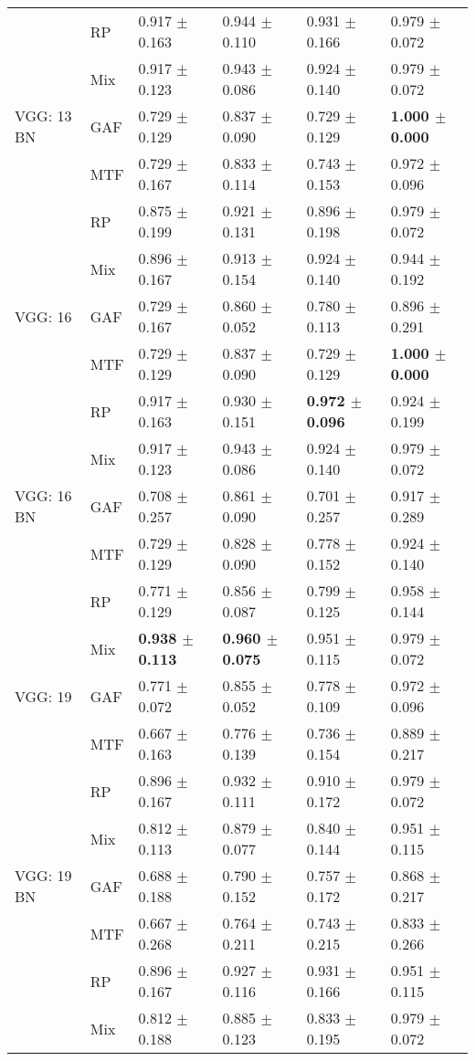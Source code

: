 \begin{longtable}[t]{llllll}
 & RP & 0.917 $\pm$ 0.163 & 0.944 $\pm$ 0.110 & 0.931 $\pm$ 0.166 & 0.979 $\pm$ 0.072 \\
 & Mix & 0.917 $\pm$ 0.123 & 0.943 $\pm$ 0.086 & 0.924 $\pm$ 0.140 & 0.979 $\pm$ 0.072 \\
VGG: 13 BN & GAF & 0.729 $\pm$ 0.129 & 0.837 $\pm$ 0.090 & 0.729 $\pm$ 0.129 & \textbf{1.000 $\pm$ 0.000} \\
 & MTF & 0.729 $\pm$ 0.167 & 0.833 $\pm$ 0.114 & 0.743 $\pm$ 0.153 & 0.972 $\pm$ 0.096 \\
 & RP & 0.875 $\pm$ 0.199 & 0.921 $\pm$ 0.131 & 0.896 $\pm$ 0.198 & 0.979 $\pm$ 0.072 \\
 & Mix & 0.896 $\pm$ 0.167 & 0.913 $\pm$ 0.154 & 0.924 $\pm$ 0.140 & 0.944 $\pm$ 0.192 \\
VGG: 16 & GAF & 0.729 $\pm$ 0.167 & 0.860 $\pm$ 0.052 & 0.780 $\pm$ 0.113 & 0.896 $\pm$ 0.291 \\
 & MTF & 0.729 $\pm$ 0.129 & 0.837 $\pm$ 0.090 & 0.729 $\pm$ 0.129 & \textbf{1.000 $\pm$ 0.000} \\
 & RP & 0.917 $\pm$ 0.163 & 0.930 $\pm$ 0.151 & \textbf{0.972 $\pm$ 0.096} & 0.924 $\pm$ 0.199 \\
 & Mix & 0.917 $\pm$ 0.123 & 0.943 $\pm$ 0.086 & 0.924 $\pm$ 0.140 & 0.979 $\pm$ 0.072 \\
VGG: 16 BN & GAF & 0.708 $\pm$ 0.257 & 0.861 $\pm$ 0.090 & 0.701 $\pm$ 0.257 & 0.917 $\pm$ 0.289 \\
 & MTF & 0.729 $\pm$ 0.129 & 0.828 $\pm$ 0.090 & 0.778 $\pm$ 0.152 & 0.924 $\pm$ 0.140 \\
 & RP & 0.771 $\pm$ 0.129 & 0.856 $\pm$ 0.087 & 0.799 $\pm$ 0.125 & 0.958 $\pm$ 0.144 \\
 & Mix & \textbf{0.938 $\pm$ 0.113} & \textbf{0.960 $\pm$ 0.075} & 0.951 $\pm$ 0.115 & 0.979 $\pm$ 0.072 \\
VGG: 19 & GAF & 0.771 $\pm$ 0.072 & 0.855 $\pm$ 0.052 & 0.778 $\pm$ 0.109 & 0.972 $\pm$ 0.096 \\
 & MTF & 0.667 $\pm$ 0.163 & 0.776 $\pm$ 0.139 & 0.736 $\pm$ 0.154 & 0.889 $\pm$ 0.217 \\
 & RP & 0.896 $\pm$ 0.167 & 0.932 $\pm$ 0.111 & 0.910 $\pm$ 0.172 & 0.979 $\pm$ 0.072 \\
 & Mix & 0.812 $\pm$ 0.113 & 0.879 $\pm$ 0.077 & 0.840 $\pm$ 0.144 & 0.951 $\pm$ 0.115 \\
VGG: 19 BN & GAF & 0.688 $\pm$ 0.188 & 0.790 $\pm$ 0.152 & 0.757 $\pm$ 0.172 & 0.868 $\pm$ 0.217 \\
 & MTF & 0.667 $\pm$ 0.268 & 0.764 $\pm$ 0.211 & 0.743 $\pm$ 0.215 & 0.833 $\pm$ 0.266 \\
 & RP & 0.896 $\pm$ 0.167 & 0.927 $\pm$ 0.116 & 0.931 $\pm$ 0.166 & 0.951 $\pm$ 0.115 \\
 & Mix & 0.812 $\pm$ 0.188 & 0.885 $\pm$ 0.123 & 0.833 $\pm$ 0.195 & 0.979 $\pm$ 0.072 \\
\end{longtable}
